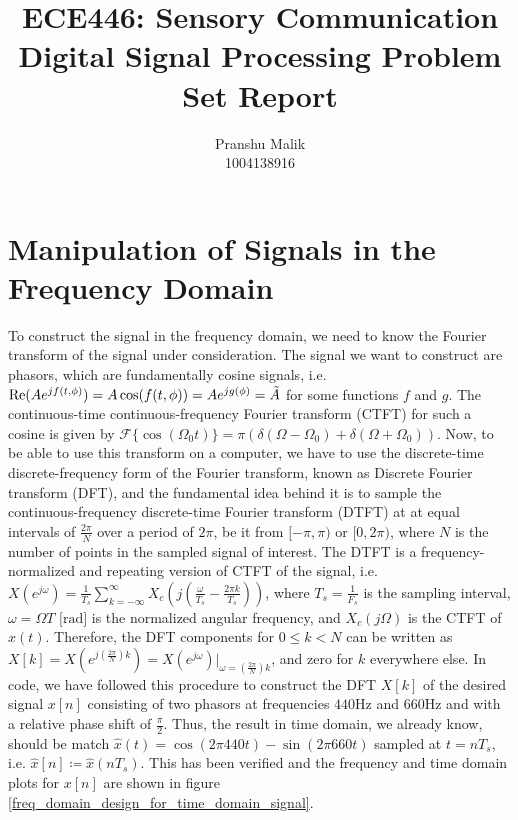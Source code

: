 \documentclass[10pt]{article}
\date{}
\begin{document}
\title{\textbf{\Large{\textsc{ECE446:} Sensory Communication}} \\ \Large{Digital Signal Processing Problem Set Report}\vspace{-0.3cm}}
\author{Pranshu Malik\\ \footnotesize{1004138916}\vspace{-3cm}}

\maketitle

\section{Manipulation of Signals in the Frequency Domain}
To construct the signal in the frequency domain, we need to know the Fourier transform of the signal under consideration. The signal we want to construct are phasors, which are fundamentally cosine signals, i.e. $\text{Re}(Ae^{jf(t,\phi)}) = A\cos(f(t,\phi)) = Ae^{jg(\phi)} = \Tilde{A}$ for some functions $f$ and $g$. The continuous-time continuous-frequency Fourier transform (CTFT) for such a cosine is given by $\mathcal{F}\{\cos(\Omega_0t)\} = \pi(\delta(\Omega - \Omega_0) + \delta(\Omega + \Omega_0))$. Now, to be able to use this transform on a computer, we have to use the discrete-time discrete-frequency form of the Fourier transform, known as Discrete Fourier transform (DFT), and the fundamental idea behind it is to sample the continuous-frequency discrete-time Fourier transform (DTFT) at at equal intervals of $\frac{2\pi}{N}$ over a period of $2\pi$, be it from $[-\pi, \pi)$ or $[0, 2\pi)$, where $N$ is the number of points in the sampled signal of interest. The DTFT is a frequency-normalized and repeating version of CTFT of the signal, i.e. $X(e^{j\omega}) = \frac{1}{T_s}\sum_{k=-\infty}^{\infty}X_c(j(\frac{\omega}{T_s} - \frac{2\pi k}{T_s}))$, where $T_s = \frac{1}{F_s}$ is the sampling interval, $\omega = \Omega T \text{ [rad]}$ is the normalized angular frequency, and $X_c(j\Omega)$ is the CTFT of $x(t)$. Therefore, the DFT components for $0\leq k < N$ can be written as $X[k] = X(e^{j(\frac{2\pi}{N})k}) = X(e^{j\omega})\rvert_{\omega = (\frac{2\pi}{N})k}$, and zero for $k$ everywhere else. In code, we have followed this procedure to construct the DFT $X[k]$ of the desired signal $x[n]$ consisting of two phasors at frequencies $440$Hz and $660$Hz and with a relative phase shift of $\frac{\pi}{2}$. Thus, the result in time domain, we already know, should be match $\hat{x}(t) = \cos(2\pi440t) - \sin(2\pi660t)$ sampled at $t = nT_s$, i.e. $\hat{x}[n] \coloneqq \hat{x}(nT_s)$. This has been verified and the frequency and time domain plots for $x[n]$ are shown in figure \ref{freq_domain_design_for_time_domain_signal}.
\end{document}
